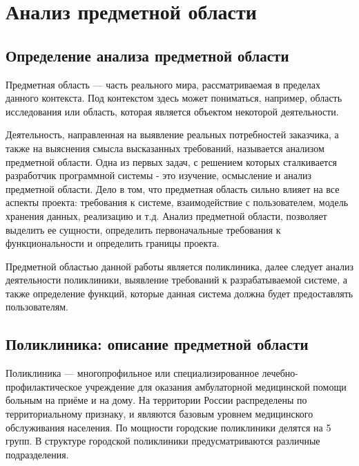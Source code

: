 \documentclass[14pt,a4paper,russian]{extreport}
\begin{document}
\addtocounter{page}{1}


\tableofcontents{}

\newpage

\sloppy

\chapter{Анализ предметной области}

\section{Определение анализа предметной области}
Предметная область — часть реального мира, рассматриваемая в пределах данного контекста. Под
контекстом здесь может пониматься, например, область исследования или область, которая является
объектом некоторой деятельности.\cite{domainknowladge}

Деятельность, направленная на выявление реальных потребностей заказчика, а также на выяснения
смысла высказанных требований, называется анализом предметной области.
Одна из первых задач, с решением которых сталкивается разработчик программной системы - это
изучение, осмысление и анализ предметной области. Дело в том, что предметная область сильно влияет
на все аспекты проекта: требования к системе, взаимодействие с пользователем, модель хранения
данных, реализацию и т.д.  Анализ предметной области, позволяет выделить ее сущности, определить
первоначальные требования к функциональности и определить границы проекта.

Предметной областью данной работы является поликлиника, далее следует анализ деятельности
поликлиники, выявление требований к разрабатываемой системе, а также определение функций, которые
данная система должна будет предоставлять пользователям.


\section{Поликлиника: описание предметной области}
Поликлиника — многопрофильное или специализированное лечебно-профилактическое учреждение для
оказания амбулаторной медицинской помощи больным на приёме и на дому.  На территории России
распределены по территориальному признаку, и являются базовым уровнем медицинского обслуживания
населения.  По мощности городские поликлиники делятся на 5 групп. В структуре городской поликлиники
предусматриваются различные подразделения.
\end{document}
